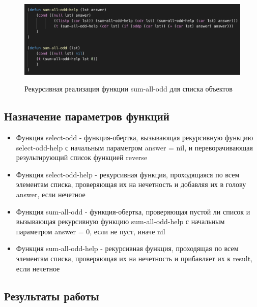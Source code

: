 \documentclass[a4paper,12pt]{article}
\begin{document}
 	\begin{figure}[h!]
 		\begin{center}
 			{\includegraphics[scale = 0.7]{6.15.3.png}}
 			\label{ris:6.15.3}
 		\end{center}
 	\caption{Рекурсивная реализация функции sum-all-odd для списка объектов}
 	\end{figure}
 	
 	\subsection*{Назначение параметров функций}
 	
 	\begin{itemize}
 		\item Функция select-odd - функция-обертка, вызывающая рекурсивную функцию select-odd-help с начальным параметром answer = nil, и переворачивающая результирующий список функцией reverse
 		\item Функция select-odd-help - рекурсивная функция, проходящаяся по всем элементам списка, проверяющая их на нечетность и добавляя их в голову answer, если нечетное
 		\item Функция sum-all-odd - функция-обертка, проверяющая пустой ли список и вызывающая рекурсивную функцию sum-all-odd-help с начальным параметром answer = 0, если не пуст, иначе nil
 		\item Функция sum-all-odd-help - рекурсивная функция, проходящая по всем элементам списка, проверяющая их на нечетность и прибавляет их к result, если нечетное
 	\end{itemize}
 	
 	\subsection*{Результаты работы}
 	
\end{document}
